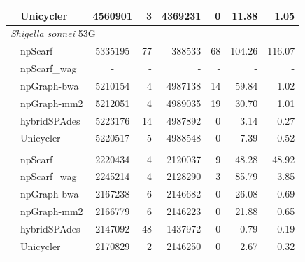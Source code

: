 \begin{longtable}[!hpt]{llcrrrrr}
\rowcolor{Gray}
& Unicycler & 4560901  & 3   &  4369231  &  0  & 11.88  & 1.05 \\
\hline
\multicolumn{8}{l}{\emph{Shigella sonnei} 53G} \\* %
\nobreakmidrule
& npScarf &  5335195 &  77  &  388533  &  68  & 104.26  &  116.07\\*
& npScarf\_wag & -  &  -  &  -  &  -  & -  &  -\\*
& npGraph-bwa & 5210154  &   4 &  4987138  & 14  & 59.84  &  1.02\\*
& npGraph-mm2 & 5212051  &  4  &   4989035 & 19  &  30.70 &  1.01\\*
& hybridSPAdes & 5223176  &  14  &  4987892  &  0  & 3.14  & 0.27\\*
& Unicycler &  5220517 &  5 &  4988548 & 0  & 7.39  &  0.52\\
\hline
\rowcolor{Gray}
\multicolumn{8}{l}{\emph{Streptococcus suis} BM407} \\* %
\nobreakmidrule
\rowcolor{Gray}
& npScarf &  2220434 & 4   &  2120037  &  9  & 48.28  & 48.92\\*
\rowcolor{Gray}
& npScarf\_wag & 2245214  &  4  &  2128290  &  3  & 85.79  & 3.85\\*
\rowcolor{Gray}
& npGraph-bwa & 2167238  &  6  &  2146682  &  0  & 26.08  & 0.69\\*
\rowcolor{Gray}
& npGraph-mm2 & 2166779  &  6  &  2146223  &  0  & 21.88  & 0.65\\*
\rowcolor{Gray}
& hybridSPAdes & 2147092  &  48  &  1437972  &  0  & 0.79  &  0.19\\*
\rowcolor{Gray}
& Unicycler &  2170829 &   2 &  2146250  &  0  &  2.67 & 0.32 \\
\hline
\end{longtable}


